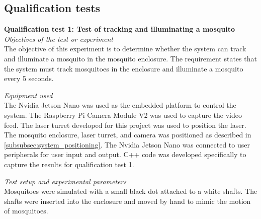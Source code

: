 \subsection{Qualification tests}
\textbf{Qualification test 1: Test of tracking and illuminating a mosquito}\\

\textit{Objectives of the test or experiment}\\
The objective of this experiment is to determine whether the system can track and illuminate a mosquito in the mosquito enclosure. The requirement states that the system must track mosquitoes in the enclosure and illuminate a mosquito every 5 seconds.

\textit{Equipment used}\\
The Nvidia Jetson Nano was used as the embedded platform to control the system. The Raspberry Pi Camera Module V2 was used to capture the video feed. The laser turret developed for this project was used to position the laser. The mosquito enclosure, laser turret, and camera was positioned as described in \autoref{subsubsec:system_positioning}. The Nvidia Jetson Nano was connected to user peripherals for user input and output. C++ code was developed specifically to capture the results for qualification test 1.

\textit{Test setup and experimental parameters}\\
Mosquitoes were simulated with a small black dot attached to a white shafts. The shafts were inserted into the enclosure and moved by hand to mimic the motion of mosquitoes.

